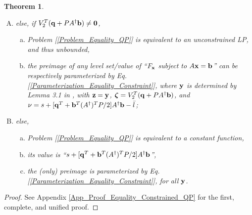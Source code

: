 \documentclass[9pt,twocolumn,twoside,lineno]{pnas-new-1}
\newcommand{\beq}{\begin{eqnarray}}
\newcommand{\eeq}{\end{eqnarray}}
\newcommand{\bfb}{{\bf b}}
\newcommand{\bfx}{{\bf x}}
\newcommand{\bfq}{{\bf q}}
\newcommand{\bfy}{{\bf y}}
\newcommand{\bfz}{{\bf z}}
\newcommand{\bfvarepsilon}{{\boldsymbol \varepsilon}}
\newcommand{\bfzeta}{{\boldsymbol \zeta}}
\newcommand{\bfzero}{{\bf 0}}
\newcommand{\real}{\mathbb{R}}
\newcommand{\calN}{{\mathcal N}}
\newcommand{\itm}{{\it m}}
\newcommand{\itn}{{\it n}}
\newtheorem{theorem}{Theorem}[section]
\theoremstyle{remark}
\begin{document}
\begin{theorem}
\begin{enumerate}[A)]
\begin{enumerate}[a)]
        and the corresponding unique optimum is, or optima are all, parameterized by,
        \beq
        \bfx^{\bar *}=\bfx_p^{\bar *}+V_2\bfvarepsilon^{\bar *},
        \label{Optimum_Equality_Constrained_QP_Unconstrained_QP}
        \eeq
        where $\bfx_p^{\bar *}\coloneqq A^\dagger\bfb-V_2(V_2^TPV_2)^\dagger V_2^T(\bfq+PA^\dagger\bfb)\in\real^\itn$ denotes the particular solution of $\bfx^{\bar *}\in\real^\itn$, $\bfvarepsilon^{\bar *}\in\real^{\itn-\itm}$, and $\bfvarepsilon^{\bar *}\in\calN(V_2^TPV_2)$,
    \item\label{Thm_Equality_Constrained_QP_Unconstrained_QP_Uniqueness} to further categorize {\rm\ref{Thm_Equality_Constrained_QP_Unconstrained_QP_Optimal_Value_Optimum})}, the optimum is unique, iff $\calN(A)\cap\calN(P)=\{\bfzero\}$;
    \end{enumerate}
\item\label{Thm_Equality_Constrained_QP_Condition_Unconstrained_LP} else, if $V_2^T(\bfq+PA^\dagger\bfb)\ne\bfzero$,
    \begin{enumerate}[a)]
    \item Problem {\rm[\ref{Problem_Equality_QP}]} is equivalent to an unconstrained LP, and thus unbounded,
    \item the preimage of any level set/value of ``$F_\bfx$ subject to $A\bfx=\bfb$'' can be respectively parameterized by Eq. [\ref{Parameterization_Equality_Constraint}], where $\bfy$ is determined by Lemma {\rm 3.1} in {\rm \cite{LiLiHs:20}}, with $\bfz=\bfy$, $\bfzeta=V_2^T(\bfq+PA^\dagger\bfb)$, and $\nu=s+[\bfq^T+\bfb^T(A^\dagger)^TP/2]A^\dagger\bfb-\bar l$;
    \end{enumerate}
\item\label{Thm_Equality_Constrained_QP_Condition_Constant} else,
    \begin{enumerate}[a)]
    \item Problem {\rm[\ref{Problem_Equality_QP}]} is equivalent to a constant function,
    \item its value is ``$s+[\bfq^T+\bfb^T(A^\dagger)^TP/2]A^\dagger\bfb$'',
    \item the (only) preimage is parameterized by Eq. {\rm[\ref{Parameterization_Equality_Constraint}]}, for all $\bfy$.
    \end{enumerate}
\end{enumerate}
\label{Thm_Equality_Constrained_QP}
\end{theorem}

\begin{proof}
See Appendix \ref{App_Proof_Equality_Constrained_QP} for the first, complete, and unified proof.
\end{proof}
\end{document}

